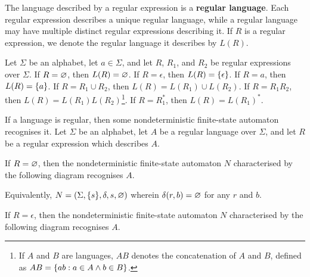 The language described by a regular expression is a {\bf regular language}. Each
regular expression describes a unique regular language, while a regular language
may have multiple distinct regular expressions describing it. If \(R\) is a
regular expression, we denote the regular language it describes by \(L(R)\).

Let \(\Sigma\) be an alphabet, let \(a \in \Sigma\), and let \(R\), \(R_1\), and
\(R_2\) be regular expressions over \(\Sigma\). If \(R = \varnothing\), then \(L(R) =
\varnothing\). If \(R = \epsilon\), then \(L(R) = \{\epsilon\}\). If \(R = a\), then
\(L(R) = \{a\}\). If \(R = R_1 \cup R_2\), then \(L(R) = L(R_1) \cup L(R_2)\).
If \(R = R_1 R_2\), then \(L(R) = L(R_1) L(R_2)\)\footnote{If \(A\) and \(B\)
are languages, \(A B\) denotes the concatenation of \(A\) and \(B\), defined
as \(A B = \{a b : a \in A \land b \in B\}\).}. If \(R = R_1^*\), then \(L(R) =
L(R_1)^*\).

\Blm
    \label{lem1}
    If a language is regular, then some nondeterministic finite-state automaton
    recognises it.
\Elm
\Bpr
    Let \(\Sigma\) be an alphabet, let \(A\) be a regular language over
    \(\Sigma\), and let \(R\) be a regular expression which describes \(A\).

    If \(R = \varnothing\), then the nondeterministic finite-state automaton \(N\)
    characterised by the following diagram recognises \(A\).
    \begin{figure}[!h]
        \centering
    \end{figure}

    \noindent Equivalently, \(N = (\Sigma, \{s\}, \delta, s, \varnothing)\) wherein
    \(\delta(r, b) = \varnothing\) for any \(r\) and \(b\).

    If \(R = \epsilon\), then the nondeterministic finite-state automaton \(N\)
    characterised by the following diagram recognises \(A\).
    \begin{figure}[!h]
        \centering
    \end{figure}


